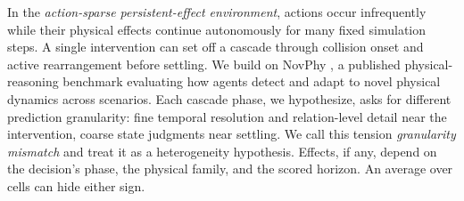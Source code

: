 In the \emph{action-sparse persistent-effect environment}, actions occur infrequently while their physical effects continue autonomously for many fixed simulation steps. A single intervention can set off a cascade through collision onset and active rearrangement before settling. We build on NovPhy \citep{pinto2024novphy}, a published physical-reasoning benchmark \citep{bakhtin2019phyre,bear2021physion,yi2020clevrer} evaluating how agents detect and adapt to novel physical dynamics across scenarios. Each cascade phase, we hypothesize, asks for different prediction granularity: fine temporal resolution and relation-level detail near the intervention, coarse state judgments near settling. We call this tension \emph{granularity mismatch} and treat it as a heterogeneity hypothesis. Effects, if any, depend on the decision's phase, the physical family, and the scored horizon. An average over cells can hide either sign.

